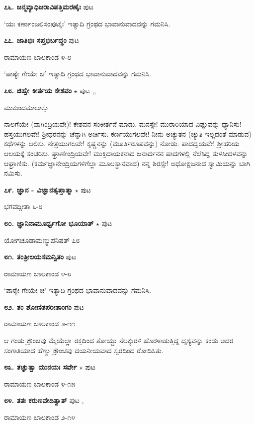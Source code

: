 \medskip
\noindent\textbf{೭೬. ಜನ್ಮವ್ಯಾಧಿಜರಾವಿಪತ್ತಿಮರಣೈಃ} \hfill ಪುಟ \pageref{173}

`ಯಃ ಕರ್ಣಾಂಜಲಿಸಂಪುಟೈಃ' ಇತ್ಯಾದಿ ಗ್ರಂಥದ ಭಾವಾನುವಾದವನ್ನು ಗಮನಿಸಿ.

\medskip
\noindent\textbf{೭೭. ಜಾತಿಭಿಃ ಸಪ್ತಭಿರ್ಬದ್ಧಂ} \hfill ಪುಟ \pageref{212}

\hfill ರಾಮಾಯಣ ಬಾಲಕಾಂಡ ೪-೮

`ಪಾಠ್ಯೇ ಗೇಯೇ ಚ' ಇತ್ಯಾದಿ ಗ್ರಂಥದ ಭಾವಾನುವಾದವನ್ನು ಗಮನಿಸಿ.

\medskip
\noindent\textbf{೭೮. ಜಿಹ್ವೇ ಕೀರ್ತಯ ಕೇಶವಂ} $\star$ \hfill ಪುಟ \pageref{214},\pageref{232d},\pageref{271}

\hfill ಮುಕುಂದಮಾಲಾಸ್ತು

ನಾಲಗೆಯೇ (ವಾಗಿಂದ್ರಿಯವೇ)! ಕೇಶವನ ಸಂಕೀರ್ತನೆ ಮಾಡು. ಮನಸ್ಸೇ! ಮುರಾರಿಯಾದ ವಿಷ್ಣುವನ್ನು ಧ್ಯಾನಿಸು! ಹಸ್ತಯುಗಲವೇ! ಶ್ರೀಧರನನ್ನು ಚೆನ್ನಾಗಿ ಅರ್ಚಿಸು. ಕರ್ಣಯುಗಲವೇ! ನೀನು ಅಚ್ಯುತನ (ಚ್ಯುತಿ ಇಲ್ಲದಂತೆ ಮಾಡುವ) ಕಥೆಗಳನ್ನು ಆಲಿಸು. ನೇತ್ರಯುಗಲವೇ! ಕೃಷ್ಣನನ್ನು (ಮೂರ್ತಿರೂಪವನ್ನು) ನೋಡು. ಪಾದದ್ವಯವೇ! ಶ್ರೀಹರಿಯ ಆಲಯಕ್ಕೆ ಸಂಚರಿಸು. ಘ್ರಾಣೇಂದ್ರಿಯವೇ! ಮುಕ್ತಿದಾಯಕನಾದ ಜನಾರ್ದನನ ಪಾದಗಳಲ್ಲಿ ನೆಲೆಸಿದ್ದ ತುಳಸೀದಳವನ್ನು ಆಘ್ರಾಣಿಸು. (ಕರ್ಮಜ್ಞಾನೇಂದ್ರಿಯಗಳಿಗೆಲ್ಲಾ ಮೂಲಸ್ಥಾನವಾದ) ನನ್ನ ಶಿರಸ್ಸೇ! ಅಧೋಕ್ಷಜನಾದ ಸ್ವಾಮಿಯನ್ನು ಬಾಗಿ ನಮಿಸು.

\medskip
\noindent\textbf{೭೯. ಜ್ಞಾನ - ವಿಜ್ಞಾನತೃಪ್ತಾತ್ಮಾ} $\star$ \hfill ಪುಟ \pageref{66}

\hfill ಭಗವದ್ಗೀತಾ ೬-೮

\medskip
\noindent\textbf{೮೦. ಜ್ಞಾನಿನಾಮೂರ್ಧ್ವಗೋ ಭೂಯಾತ್} $\star$ \hfill ಪುಟ \pageref{13b}

\hfill ಯೋಗಚೂಡಾಮಣ್ಯುಪನಿಷತ್ ೭೮

\medskip
\noindent\textbf{೮೧. ತಂತ್ರೀಲಯಸಮನ್ವಿತಂ} \hfill ಪುಟ \pageref{250}

\hfill ರಾಮಾಯಣ ಬಾಲಕಾಂಡ ೪-೮

`ಪಾಠ್ಯೇ ಗೇಯೇ ಚ' ಇತ್ಯಾದಿ ಗ್ರಂಥದ ಭಾವಾನುವಾದವನ್ನು ಗಮನಿಸಿ.

\medskip
\noindent\textbf{೮೨. ತಂ ಶೋಣಿತಪರೀತಾಂಗಂ} \hfill ಪುಟ \pageref{198c}

\hfill ರಾಮಾಯಣ ಬಾಲಕಾಂಡ ೨-೧೧

ಆ ಗಂಡು ಕ್ರೌಂಚವು ಮೈಯೆಲ್ಲಾ ರಕ್ತದಿಂದ ತೋಯ್ದು ನೆಲಕ್ಕುರಳಿ ಹೊರಳಾಡುತ್ತಿದ್ದ ದೃಶ್ಯವನ್ನು ಕಂಡು ಅದರ ಸಂಗಾತಿಯಾದ ಹೆಣ್ಣು ಕ್ರೌಂಚವು ದಯನೀಯವಾದ ಸ್ವರದಿಂದ ರೋದಿಸಿತು.

\medskip
\noindent\textbf{೮೩. ತಚ್ಘುತ್ವಾ ಮುನಯಃ ಸರ್ವೇ} $\star$ \hfill ಪುಟ \pageref{158}

\hfill ರಾಮಾಯಣ ಬಾಲಕಾಂಡ ೪-೧೫

\medskip
\noindent\textbf{೮೪. ತತಃ ಕರುಣವೇದಿತ್ವಾತ್} \hfill ಪುಟ \pageref{199},\pageref{211i}

\hfill ರಾಮಾಯಣ ಬಾಲಕಾಂಡ ೨-೧೪

